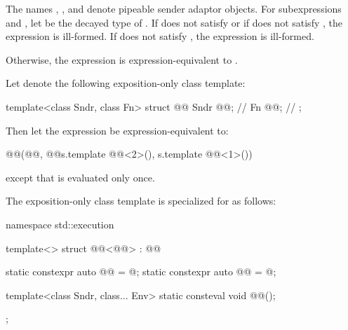 \pnum
The names , , and  denote
pipeable sender adaptor objects.
For subexpressions  and ,
let  be the decayed type of .
If  does not satisfy  or
if  does not satisfy ,
the expression  is ill-formed.
If  does not satisfy ,
the expression  is ill-formed.

\pnum
Otherwise,
the expression  is expression-equivalent to
.

\pnum
Let  denote the following exposition-only class template:
\begin{codeblock}
template<class Sndr, class Fn>
struct @@ {
  Sndr @@;    // \expos
  Fn @@;        // \expos
};
\end{codeblock}

\pnum
Then let the expression 
be expression-equivalent to:
\begin{codeblock}
@@(@@{}, @@{s.template @@<2>(), s.template @@<1>()})
\end{codeblock}
except that  is evaluated only once.

\pnum
The exposition-only class template 
is specialized for  as follows:
\begin{codeblock}
namespace std::execution {
  template<>
  struct @@<@@> : @@ {
    static constexpr auto @@ = @\seebelow@;
    static constexpr auto @@ = @\seebelow@;

    template<class Sndr, class... Env>
      static consteval void @@();
  };
}
\end{codeblock}

